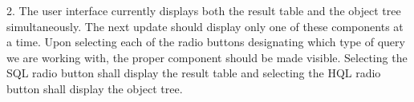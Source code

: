 2. The user interface currently displays both the result table and the object tree simultaneously. The next update should display only one of these components at a time. Upon selecting each of the radio buttons designating which type of query we are working with, the proper component should be made visible. Selecting the SQL radio button shall display the result table and selecting the HQL radio button shall display the object tree.
